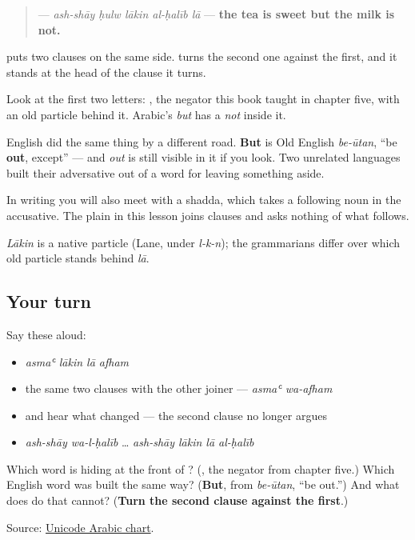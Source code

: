 \begin{quote}
\textbf{    } — \emph{ash-shāy ḥulw lākin al-ḥalīb lā} — \textbf{the tea is sweet but the milk is not.}
\end{quote}

\textbf{} puts two clauses on the same side. \textbf{} turns the second one against the first, and it stands at the head of the clause it turns.

\begin{cousinweb}
Look at the first two letters: \textbf{}, the negator this book taught in chapter five, with an old particle behind it. Arabic's \emph{but} has a \emph{not} inside it.

English did the same thing by a different road. \textbf{But} is Old English \emph{be-ūtan}, \textquotedblleft{}be \textbf{out}, except\textquotedblright{} — and \emph{out} is still visible in it if you look. Two unrelated languages built their adversative out of a word for leaving something aside.

In writing you will also meet \textbf{} with a shadda, which takes a following noun in the accusative. The plain \textbf{} in this lesson joins clauses and asks nothing of what follows.

\emph{Lākin} is a native particle (Lane, under \emph{l-k-n}); the grammarians differ over which old particle stands behind \emph{lā}.
\end{cousinweb}

\subsection*{Your turn}
Say these aloud:

\begin{itemize}
\raggedright
  \item \emph{asmaʿ lākin lā afham}
  \item the same two clauses with the other joiner — \emph{asmaʿ wa-afham}
  \item and hear what changed — the second clause no longer argues
  \item \emph{ash-shāy wa-l-ḥalīb} … \emph{ash-shāy lākin lā al-ḥalīb}
\end{itemize}

\begin{tcolorbox}[breakable,colback=teal!4,colframe=teal!35!black,title={Before you move on}]
Which word is hiding at the front of \textbf{}? (\textbf{}, the negator from chapter five.) Which English word was built the same way? (\textbf{But}, from \emph{be-ūtan}, \textquotedblleft{}be out.\textquotedblright{}) And what does \textbf{} do that \textbf{} cannot? (\textbf{Turn the second clause against the first}.)

Source: \href{https://www.unicode.org/charts/PDF/U0600.pdf}{Unicode Arabic chart}.
\end{tcolorbox}
